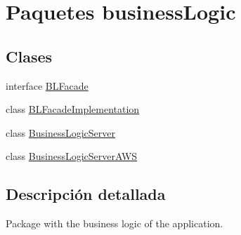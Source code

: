 \hypertarget{namespacebusinessLogic}{}\section{Paquetes business\+Logic}
\label{namespacebusinessLogic}
\subsection*{Clases}
\begin{DoxyCompactItemize}
\item 
interface \mbox{\hyperlink{interfacebusinessLogic_1_1BLFacade}{B\+L\+Facade}}
\item 
class \mbox{\hyperlink{classbusinessLogic_1_1BLFacadeImplementation}{B\+L\+Facade\+Implementation}}
\item 
class \mbox{\hyperlink{classbusinessLogic_1_1BusinessLogicServer}{Business\+Logic\+Server}}
\item 
class \mbox{\hyperlink{classbusinessLogic_1_1BusinessLogicServerAWS}{Business\+Logic\+Server\+A\+WS}}
\end{DoxyCompactItemize}


\subsection{Descripción detallada}
Package with the business logic of the application. 